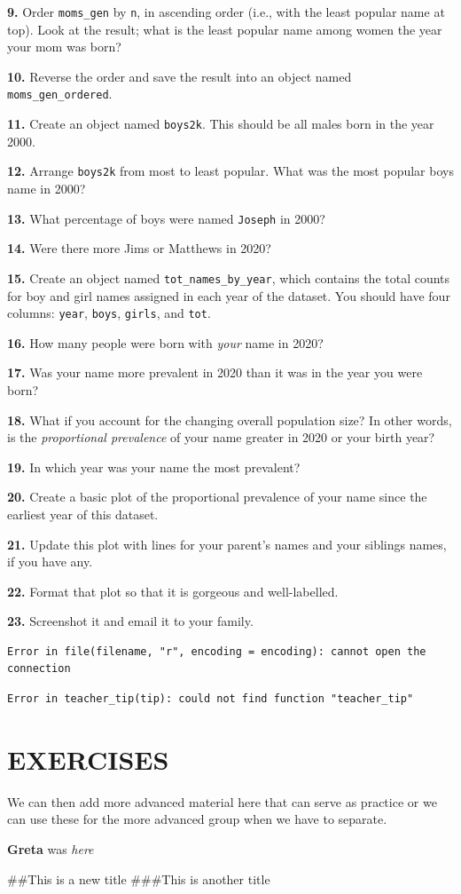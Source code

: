 \documentclass[
]{book}
\begin{document}
\textbf{9.} Order \texttt{moms\_gen} by \texttt{n}, in ascending order (i.e., with the least popular name at top). Look at the result; what is the least popular name among women the year your mom was born?

\textbf{10.} Reverse the order and save the result into an object named \texttt{moms\_gen\_ordered}.

\textbf{11.} Create an object named \texttt{boys2k}. This should be all males born in the year 2000.

\textbf{12.} Arrange \texttt{boys2k} from most to least popular. What was the most popular boys name in 2000?

\textbf{13.} What percentage of boys were named \texttt{Joseph} in 2000?

\textbf{14.} Were there more Jims or Matthews in 2020?

\textbf{15.} Create an object named \texttt{tot\_names\_by\_year}, which contains the total counts for boy and girl names assigned in each year of the dataset. You should have four columns: \texttt{year}, \texttt{boys}, \texttt{girls}, and \texttt{tot}.

\textbf{16.} How many people were born with \emph{your} name in 2020?

\textbf{17.} Was your name more prevalent in 2020 than it was in the year you were born?

\textbf{18.} What if you account for the changing overall population size? In other words, is the \emph{proportional prevalence} of your name greater in 2020 or your birth year?

\textbf{19.} In which year was your name the most prevalent?

\textbf{20.} Create a basic plot of the proportional prevalence of your name since the earliest year of this dataset.

\textbf{21.} Update this plot with lines for your parent's names and your siblings names, if you have any.

\textbf{22.} Format that plot so that it is gorgeous and well-labelled.

\textbf{23.} Screenshot it and email it to your family.

\begin{verbatim}
Error in file(filename, "r", encoding = encoding): cannot open the connection
\end{verbatim}

\begin{verbatim}
Error in teacher_tip(tip): could not find function "teacher_tip"
\end{verbatim}

\part{EXERCISES}\label{part-exercises}

We can then add more advanced material here that can serve as practice or we can use these for the more advanced group when we have to separate.

\textbf{Greta} was \emph{here}

\#\#This is a new title
\#\#\#This is another title
\end{document}
